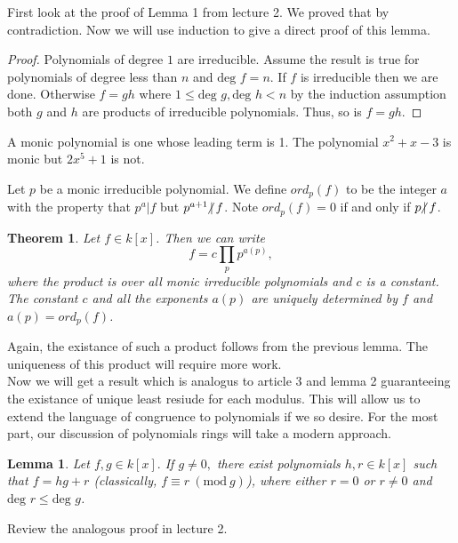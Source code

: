 \documentclass{article}
\theoremstyle{problemstyle}
\newtheorem{theorem}{Theorem}
\newtheorem{lemma}{Lemma}
\newcommand{\Mod}[1]{\ (\mathrm{mod}\ #1)}
\newcommand{\ndiv}{\hspace{-4pt}\not|\hspace{2pt}}
\begin{document}
First look at the proof of Lemma 1 from lecture 2. We proved that by contradiction. Now we will use induction to give a direct proof of this lemma. 

\begin{proof}
Polynomials of degree $1$ are irreducible. Assume the result is true for polynomials of degree less than $n$ and $\text{deg } f = n$. If $f$ is irreducible then we are done. Otherwise $f = gh$ where $1 \leq \text{deg } g, \text{deg } h < n$ by the induction assumption both $g$ and $h$ are products of irreducible polynomials. Thus, so is $f = gh$. 
\end{proof}

A monic polynomial is one whose leading term is 1.  The polynomial $x^2 + x -3$ is monic but $2x^5+1$ is not. 

Let $p$ be a monic irreducible polynomial. We define $ord_p(f)$ to be the integer $a$ with the property that $p^a|f$ but $p^{a+1}\ndiv f$. Note $ord_p(f) = 0$ if and only if $p\ndiv f$. 

\setcounter{theorem}{1}
\begin{theorem}
Let $f \in k[x]$. Then we can write $$f = c\prod_pp^{a(p)},$$ where the product is over all monic irreducible polynomials and $c$ is a constant. The constant $c$ and all the exponents $a(p)$ are uniquely determined by $f$ and $a(p) = ord_p(f)$.
\end{theorem}

Again, the existance of such a product follows from the previous lemma. The uniqueness of this product will require more work.\\ 

Now we will get a result which is analogus to article 3 and lemma 2 guaranteeing the existance of unique least resiude for each modulus. This will allow us to extend the language of congruence to polynomials if we so desire. For the most part, our discussion of polynomials rings will take a modern approach. 

\begin{lemma}
Let $f,g \in k[x].$ If $g \neq 0,$ there exist polynomials $h,r \in k[x]$ such that $f = hg + r$ (classically, $f \equiv r \Mod{g}$), where either $r = 0$ or $r \neq 0$ and $\text{deg } r \leq \text{deg } g$.  
\end{lemma}

Review the analogous proof in lecture 2.  
\end{document}
